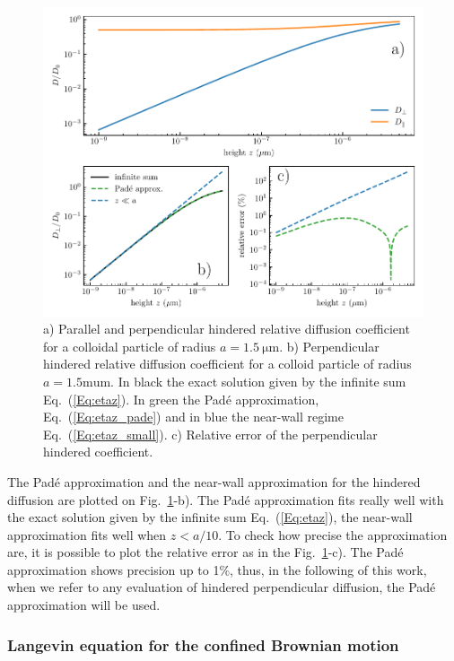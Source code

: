 \begin{figure}[H]
	\centering
	\includegraphics{02_body/chapter3/images/theory_lambda/hindered_diffusion.pdf}
	\caption{a)  Parallel and perpendicular hindered relative diffusion coefficient for a colloidal particle of radius $a = 1.5 ~ \mathrm{\mu m}$. b) Perpendicular hindered relative diffusion coefficient for a colloid particle of radius $a = 1.5 \mathrm{mu m}$. In black the exact solution given by the infinite sum Eq.~(\ref{Eq:etaz}). In green the Padé approximation, Eq.~(\ref{Eq:etaz_pade}) and in blue the near-wall regime Eq.~(\ref{Eq:etaz_small}). c) Relative error of the perpendicular hindered coefficient.}
	\label{fig.etaz}
\end{figure}


The Padé approximation and the near-wall approximation for the hindered diffusion are plotted on Fig.~\ref{fig.etaz}-b). The Padé approximation fits really well with the exact solution given by the infinite sum Eq.~(\ref{Eq:etaz}), the near-wall approximation fits well when $z < a / 10$. To check how precise the approximation are, it is possible to plot the relative error as in the Fig.~\ref{fig.etaz}-c). The Padé approximation shows precision up to 1\%, thus, in the following of this work, when we refer to any evaluation of hindered perpendicular diffusion, the Padé approximation will be used. 


\subsubsection{Langevin equation for the confined Brownian motion}

